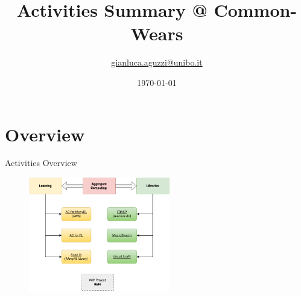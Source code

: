 \documentclass[presentation, 9pt, aspectratio=169]{beamer}\mode<presentation>{\usetheme{AMSBolognaFC}}
\title[Activities Summary]
{Activities Summary @ Common-Wears}
\author[\sspeaker{Aguzzi}]
{\speaker{Gianluca Aguzzi} \href{mailto:gianluca.aguzzi@unibo.it}{gianluca.aguzzi@unibo.it} \\
}
\institute[DISI, Univ.\ Bologna]
{%
\textsc{Alma Mater Studiorum} -- Universit{\`a} di Bologna \\[0.1cm]
\textbf{Talk @} \bold{Common Wears}\\[0.15cm]
}
\date[\today]{\today}
\begin{document}
\frame{\titlepage}

\section{Overview}
\begin{frame}[fragile]{Activities Overview}
	\begin{figure}
		\centering
		\includegraphics[width=0.55\textwidth]{img/activities-overview.drawio}
	\end{figure}
\end{frame}
\end{document}
